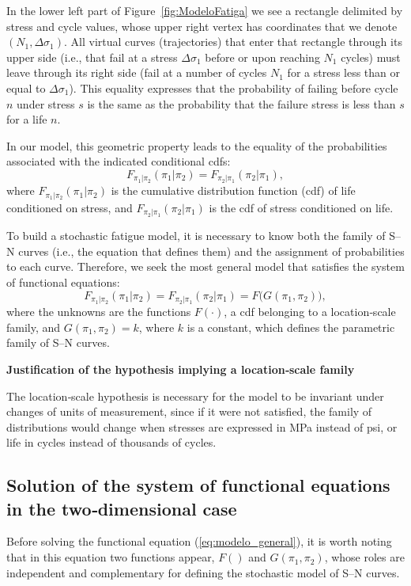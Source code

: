 In the lower left part of Figure~\ref{fig:ModeloFatiga} we see a rectangle delimited by stress and cycle values, whose upper right vertex has coordinates that we denote $(N_1, \Delta\sigma_1)$. All virtual curves (trajectories) that enter that rectangle through its upper side (i.e., that fail at a stress $\Delta\sigma_1$ before or upon reaching $N_1$ cycles) must leave through its right side (fail at a number of cycles $N_1$ for a stress less than or equal to $\Delta\sigma_1$). This equality expresses that the probability of failing before cycle $n$ under stress $s$ is the same as the probability that the failure stress is less than $s$ for a life $n$.

In our model, this geometric property leads to the equality of the probabilities associated with the indicated conditional cdfs:
\begin{equation}
F_{\pi_1|\pi_2}(\pi_1|\pi_2) = F_{\pi_2|\pi_1}(\pi_2|\pi_1),
\label{eq:conditional_intro}
\end{equation}
where $F_{\pi_1|\pi_2}(\pi_1|\pi_2)$ is the cumulative distribution function (cdf) of life conditioned on stress, and $F_{\pi_2|\pi_1}(\pi_2|\pi_1)$ is the cdf of stress conditioned on life.

To build a stochastic fatigue model, it is necessary to know both the family of S–N curves (i.e., the equation that defines them) and the assignment of probabilities to each curve. Therefore, we seek the most general model that satisfies the system of functional equations:
\begin{equation}
F_{\pi_1|\pi_2}(\pi_1|\pi_2) = F_{\pi_2|\pi_1}(\pi_2|\pi_1) = F\bigl(G(\pi_1,\pi_2)\bigr),
\label{eq:modelo_general}
\end{equation}
where the unknowns are the functions $F(\cdot)$, a cdf belonging to a location‑scale family, and $G(\pi_1,\pi_2)=k$, where $k$ is a constant, which defines the parametric family of S–N curves.

\noindent \textbf{Justification of the hypothesis implying a location‑scale family}

The location‑scale hypothesis is necessary for the model to be invariant under changes of units of measurement, since if it were not satisfied, the family of distributions would change when stresses are expressed in MPa instead of psi, or life in cycles instead of thousands of cycles.

\subsection{Solution of the system of functional equations in the two‑dimensional case}
Before solving the functional equation (\ref{eq:modelo_general}), it is worth noting that in this equation two functions appear, $F()$ and $G(\pi_1,\pi_2)$, whose roles are independent and complementary for defining the stochastic model of S–N curves.

